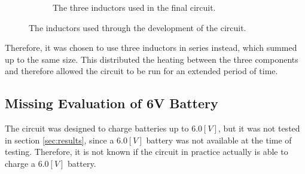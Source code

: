 \documentclass[../report.tex]{subfiles}
\begin{document}
\begin{figure}[H]
\begin{subfigure}[t]{0.49\textwidth}
        \captionsetup{width=0.9\textwidth}
        \caption{The three inductors used in the final circuit.}  
        \label{fig:inductors:triple}
    \end{subfigure}
    \caption{The inductors used through the development of the circuit.} 
    \label{fig:inductors}
\end{figure}

Therefore, it was chosen to use three inductors in series instead, which summed up to the same size. This distributed the heating between the three components and therefore allowed the circuit to be run for an extended period of time.

\subsection*{Missing Evaluation of 6V Battery}
The circuit was designed to charge batteries up to $6.0 [V]$, but it was not tested in section \ref{sec:results}, since a $6.0 [V]$ battery was not available at the time of testing. Therefore, it is not known if the circuit in practice actually is able to charge a $6.0 [V]$ battery.
\end{document}
